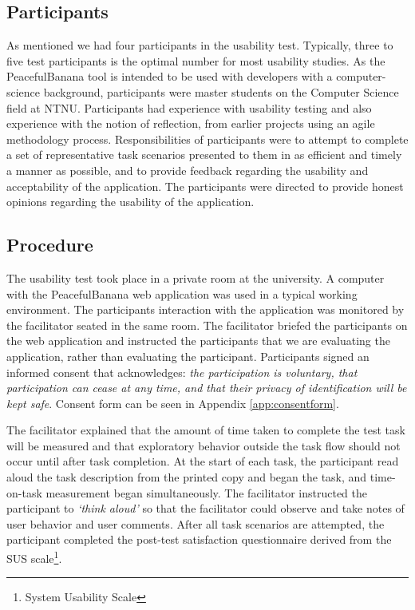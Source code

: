 \subsection{Participants}
As mentioned we had four participants in the usability test. Typically, three to five test participants is the optimal number for most usability studies\citep{nielsen1993mathematical}. As the PeacefulBanana tool is intended to be used with developers with a computer-science background, participants were master students on the Computer Science field at NTNU. Participants had experience with usability testing and also experience with the notion of reflection, from earlier projects using an agile methodology process.
Responsibilities of participants were to attempt to complete a set of representative task scenarios presented to them in as efficient and timely a manner as possible, and to provide feedback regarding the usability and acceptability of the application. The participants were directed to provide honest opinions regarding the usability of the application.

\subsection{Procedure}
The usability test took place in a private room at the university. A computer with the PeacefulBanana web application was used in a typical working environment. The participants interaction with the application was monitored by the facilitator seated in the same room.
The facilitator briefed the participants on the web application and instructed the participants that we are evaluating the application, rather than evaluating the participant. Participants signed an informed consent that acknowledges: \emph{the participation is voluntary, that participation can cease at any time, and that their privacy of identification will be kept safe}. Consent form can be seen in Appendix \ref{app:consentform}.

The facilitator explained that the amount of time taken to complete the test task will be measured and that exploratory behavior outside the task flow should not occur until after task completion. At the start of each task, the participant read aloud the task description from the printed copy and began the task, and time-on-task measurement began simultaneously.
The facilitator instructed the participant to \emph{‘think aloud’} so that the facilitator could observe and take notes of user behavior and user comments.
After all task scenarios are attempted, the participant completed the post-test satisfaction questionnaire derived from the SUS scale\footnote{System Usability Scale}.

